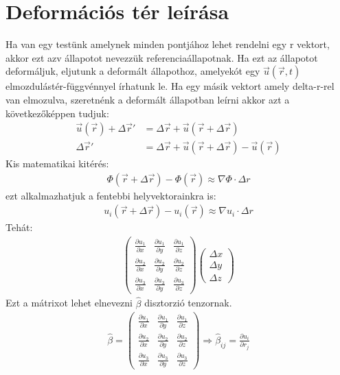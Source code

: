 \documentclass{article}
\begin{document}
\section{Deformációs tér leírása}
Ha van egy testünk amelynek minden pontjához lehet rendelni egy r vektort, akkor ezt azv állapotot nevezzük referenciaállapotnak. Ha ezt az állapotot deformáljuk, eljutunk a deformált állapothoz, amelyekót egy $\vec{u}(\vec{r},t)$ elmozdulástér-függvénnyel írhatunk le. Ha egy másik vektort amely delta-r-rel van elmozulva, szeretnénk a deformált állapotban leírni akkor azt a következőképpen tudjuk:
\begin{align*}
\vec{u}(\vec{r}) + \Delta \vec{r}' &= \Delta \vec{r} + \vec{u} (\vec{r} + \Delta \vec{r})\\
\Delta \vec{r}' &= \Delta \vec{r} + \vec{u} (\vec{r} + \Delta \vec{r}) - \vec{u}(\vec{r})
\end{align*}
Kis matematikai kitérés:
\begin{align*}
\Phi(\vec{r} + \Delta \vec{r})-\Phi(\vec{r}) \approx \nabla \Phi \cdot \Delta r
\end{align*}
ezt alkalmazhatjuk a fentebbi helyvektorainkra is:
\begin{align*}
u_i(\vec{r}+\Delta\vec{r})-u_i(\vec{r}) \approx \nabla u_i \cdot \Delta r
\end{align*}
Tehát:
\begin{align*}
\begin{pmatrix}
\frac{\partial u_1}{\partial x} & \frac{\partial u_1}{\partial y} & \frac{\partial u_1}{\partial z} \\
\frac{\partial u_2}{\partial x} & \frac{\partial u_2}{\partial y} & \frac{\partial u_2}{\partial z}\\ 
\frac{\partial u_3}{\partial x} & \frac{\partial u_3}{\partial y} & \frac{\partial u_3}{\partial z}
\end{pmatrix}
\begin{pmatrix}
\Delta x \\\Delta y \\ \Delta z
\end{pmatrix}
\end{align*}
Ezt a mátrixot lehet elnevezni $\hat{\beta}$ disztorzió tenzornak.
\begin{align*}
\hat{\beta} = \begin{pmatrix}
\frac{\partial u_1}{\partial x} & \frac{\partial u_1}{\partial y} & \frac{\partial u_1}{\partial z} \\
\frac{\partial u_2}{\partial x} & \frac{\partial u_2}{\partial y} & \frac{\partial u_2}{\partial z}\\ 
\frac{\partial u_3}{\partial x} & \frac{\partial u_3}{\partial y} & \frac{\partial u_3}{\partial z}
\end{pmatrix} \Rightarrow \hat{\beta}_{ij} = \frac{\partial u_i}{\partial r_j}
\end{align*}
\end{document}
